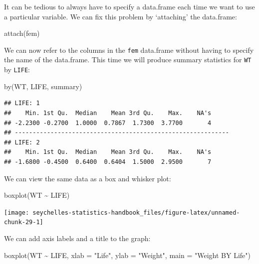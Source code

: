 \documentclass[
  12pt,
]{book}
\newenvironment{Shaded}{\begin{snugshade}}{\end{snugshade}}
\newcommand{\AttributeTok}[1]{\textcolor[rgb]{0.77,0.63,0.00}{#1}}
\newcommand{\FunctionTok}[1]{\textcolor[rgb]{0.00,0.00,0.00}{#1}}
\newcommand{\NormalTok}[1]{#1}
\newcommand{\SpecialCharTok}[1]{\textcolor[rgb]{0.00,0.00,0.00}{#1}}
\newcommand{\StringTok}[1]{\textcolor[rgb]{0.31,0.60,0.02}{#1}}
\begin{document}
It can be tedious to always have to specify a data.frame each time we want to use a particular variable. We can
fix this problem by `attaching' the data.frame:

\begin{Shaded}
\begin{Highlighting}[]
\FunctionTok{attach}\NormalTok{(fem)}
\end{Highlighting}
\end{Shaded}

We can now refer to the columns in the \texttt{fem} data.frame without having to specify the name of the data.frame. This time we will produce summary statistics for \texttt{WT} by \texttt{LIFE}:

\begin{Shaded}
\begin{Highlighting}[]
\FunctionTok{by}\NormalTok{(WT, LIFE, summary)}
\end{Highlighting}
\end{Shaded}

\begin{verbatim}
## LIFE: 1
##    Min. 1st Qu.  Median    Mean 3rd Qu.    Max.    NA's 
## -2.2300 -0.2700  1.0000  0.7867  1.7300  3.7700       4 
## ------------------------------------------------------------ 
## LIFE: 2
##    Min. 1st Qu.  Median    Mean 3rd Qu.    Max.    NA's 
## -1.6800 -0.4500  0.6400  0.6404  1.5000  2.9500       7
\end{verbatim}

We can view the same data as a box and whisker plot:

\begin{Shaded}
\begin{Highlighting}[]
\FunctionTok{boxplot}\NormalTok{(WT }\SpecialCharTok{\textasciitilde{}}\NormalTok{ LIFE)}
\end{Highlighting}
\end{Shaded}

\begin{center}\texttt{[image: seychelles-statistics-handbook\_files/figure-latex/unnamed-chunk-29-1]} \end{center}

\newpage

We can add axis labels and a title to the graph:

\begin{Shaded}
\begin{Highlighting}[]
\FunctionTok{boxplot}\NormalTok{(WT }\SpecialCharTok{\textasciitilde{}}\NormalTok{ LIFE,}
        \AttributeTok{xlab =} \StringTok{"Life"}\NormalTok{,}
        \AttributeTok{ylab =} \StringTok{"Weight"}\NormalTok{,}
        \AttributeTok{main =} \StringTok{"Weight BY Life"}\NormalTok{)}
\end{Highlighting}
\end{Shaded}
\end{document}

